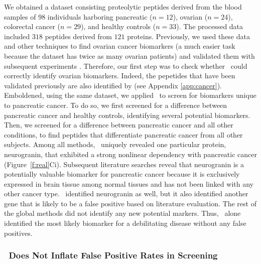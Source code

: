 \documentclass[11pt]{extarticle}
\begin{document}
We obtained a dataset consisting  proteolytic peptides derived from the blood samples of  $98$ individuals harboring pancreatic ($n=12$), ovarian ($n=24$), colorectal cancer ($n=29$), and healthy controls  ($n=33$).
The processed data included $318$ peptides derived from $121$ proteins.
Previously, we used these data and other techniques to find ovarian cancer biomarkers (a much easier task because the dataset has twice as many ovarian patients) and validated them with subsequent experiments \cite{Wang2017}. Therefore, our first step was to check whether \Mgc~could correctly identify ovarian biomarkers. Indeed, the pepetides that have been validated previously are also identified by \Mgc (see Appendix \ref{app:cancer}).
Emboldened, using the same dataset,
we applied \Mgc~to screen for biomarkers unique to pancreatic cancer.  To do so, we first screened  for a difference between pancreatic cancer and healthy controls, identifying several potential biomarkers.  Then, we screened for a difference between pancreatic cancer and all other conditions, to find peptides that differentiate pancreatic cancer from all other subjects.
Among all methods, \Mgc~uniquely revealed one particular protein, neurogranin, that exhibited a strong nonlinear dependency with pancreatic cancer (Figure~\ref{f:real}{\color{magenta}Ci}).
Subsequent literature searches reveal that neurogranin is a potentially valuable biomarker for pancreatic cancer because it is exclusively expressed in brain tissue among normal tissues and has not been linked with any other cancer type.
\Hhg~identified neurogranin as well, but it also identified another gene that is likely to be a false positive based on literature evaluation. The rest of the global methods did not identify any new potential markers. Thus, \Mgc~alone identified the most likely biomarker for a debilitating disease without any false positives.

\subsubsection*{\Mgc~Does Not Inflate False Positive Rates in Screening}
\end{document}
